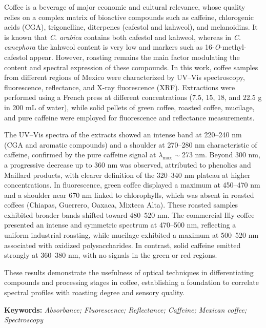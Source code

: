 \documentclass{article}
\newcommand{\keywords}[1]{%
  \par\smallskip\noindent\textbf{Keywords:} \textit{#1}\par
}
\begin{document}
\begin{abstractbox}[title=\textbf{Abstract}]
Coffee is a beverage of major economic and cultural relevance, whose quality relies on a complex matrix of bioactive compounds such as caffeine, chlorogenic acids (CGA), trigonelline, diterpenes (cafestol and kahweol), and melanoidins. It is known that \textit{C. arabica} contains both cafestol and kahweol, whereas in \textit{C. canephora} the kahweol content is very low and markers such as 16-\textit{O}-methyl-cafestol appear. However, roasting remains the main factor modulating the content and spectral expression of these compounds. In this work, coffee samples from different regions of Mexico were characterized by UV–Vis spectroscopy, fluorescence, reflectance, and X-ray fluorescence (XRF). Extractions were performed using a French press at different concentrations (7.5, 15, 18, and 22.5 g in 200 mL of water), while solid pellets of green coffee, roasted coffee, mucilage, and pure caffeine were employed for fluorescence and reflectance measurements.  

The UV–Vis spectra of the extracts showed an intense band at 220--240 nm (CGA and aromatic compounds) and a shoulder at 270--280 nm characteristic of caffeine, confirmed by the pure caffeine signal at $\lambda_{\max}\sim$273 nm. Beyond 300 nm, a progressive decrease up to 360 nm was observed, attributed to phenolics and Maillard products, with clearer definition of the 320--340 nm plateau at higher concentrations. In fluorescence, green coffee displayed a maximum at 450--470 nm and a shoulder near 670 nm linked to chlorophylls, which was absent in roasted coffees (Chiapas, Guerrero, Oaxaca, Mixteca Alta). These roasted samples exhibited broader bands shifted toward 480--520 nm. The commercial Illy coffee presented an intense and symmetric spectrum at 470--500 nm, reflecting a uniform industrial roasting, while mucilage exhibited a maximum at 500--520 nm associated with oxidized polysaccharides. In contrast, solid caffeine emitted strongly at 360--380 nm, with no signals in the green or red regions.  

These results demonstrate the usefulness of optical techniques in differentiating compounds and processing stages in coffee, establishing a foundation to correlate spectral profiles with roasting degree and sensory quality.
\end{abstractbox}

\keywords{Absorbance; Fluorescence; Reflectance; Caffeine; Mexican coffee; Spectroscopy}
\end{document}
